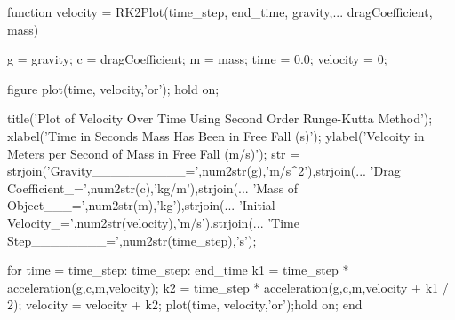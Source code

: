 \documentclass[12pt]{article}
\begin{document}
\begin{verbatimtab}
function velocity = RK2Plot(time_step, end_time, gravity,... 
                        dragCoefficient, mass)
                    

    g = gravity;            %
    c = dragCoefficient;    %
    m = mass;               %
    time = 0.0;             %
    velocity = 0;           %

    figure
    plot(time, velocity,'or'); hold on;
    
    title('Plot of Velocity Over Time Using Second Order Runge-Kutta Method');
    xlabel('Time in Seconds Mass Has Been in Free Fall (s)');%
    ylabel('Velcoity in Meters per Second of Mass in Free Fall (m/s)');
    str = {strjoin({'Gravity__________=',num2str(g),'m/s^2'}),strjoin(...      %
                   {'Drag Coefficient_=',num2str(c),'kg/m'}),strjoin(...       %
                   {'Mass of Object___=',num2str(m),'kg'}),strjoin(...         %
                   {'Initial Velocity_=',num2str(velocity),'m/s'}),strjoin(... %
                   {'Time Step________=',num2str(time_step),'s'})};            %
    
    for time = time_step: time_step: end_time
        k1 = time_step * acceleration(g,c,m,velocity);
        k2 = time_step * acceleration(g,c,m,velocity + k1 / 2);
        velocity = velocity + k2;
        plot(time, velocity,'or');hold on;
    end


\end{verbatimtab}
\end{document}
